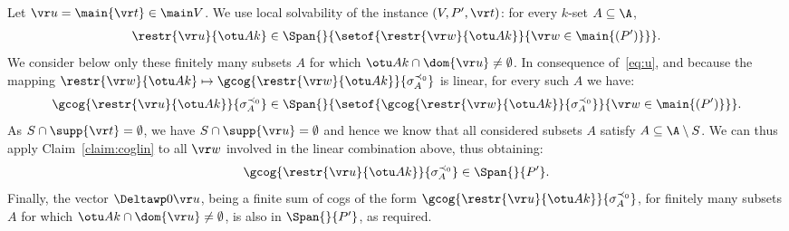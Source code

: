 

\medskip

\claimDeltat*
\begin{claimproof}
Let $\vr u = \main{\vr t} \in \main V$.
We use local solvability of the instance $(V, P', \vr t)$: for every $k$-set $A\subseteq \A$, 
\begin{align} \label{eq:u}
\restr{\vr u} {\otu A k} \in \Span {} {\setof{\restr {\vr w} {\otu A k}}{\vr w \in \main {(P')}}}.
\end{align}
%
We consider below only these finitely many subsets $A$ for which $\otu A k \cap \dom{\vr u} \neq \emptyset$.
In consequence of~\eqref{eq:u}, and because the mapping 
$\restr {\vr w}{\otu A k} \mapsto \gcog {\restr {\vr w}{\otu A k}}{\sigma^{\prec_0}_A}$ is linear, for every such $A$ we have:
\[
\gcog {\restr{\vr u} {\otu A k}} {\sigma^{\prec_0}_A} \in 
\Span {} {\setof{\gcog{\restr {\vr w} {\otu A k}}{\sigma^{\prec_0}_A}}{\vr w \in \main {(P')}}}.
\]
As $S\cap \supp{\vr t} = \emptyset$,
we have $S\cap \supp{\vr u} = \emptyset$ and hence we know that all considered subsets $A$ satisfy 
$A\subseteq \A \setminus S$.
We can thus apply Claim~\ref{claim:coglin} to
all $\vr w$ involved in the linear combination above, thus obtaining:
\[
\gcog {\restr{\vr u} {\otu A k}} {\sigma^{\prec_0}_A} \in \Span {} {P'}.
\]
Finally, the vector $\Deltawp 0 \vr u$, being a finite sum of cogs of the form $\gcog {\restr{\vr u} {\otu A k}} {\sigma^{\prec_0}_A}$, 
for finitely many subsets $A$ for which $\otu A k \cap \dom{\vr u} \neq \emptyset$,
is also in $\Span {} {P'}$, as required.
\end{claimproof}



